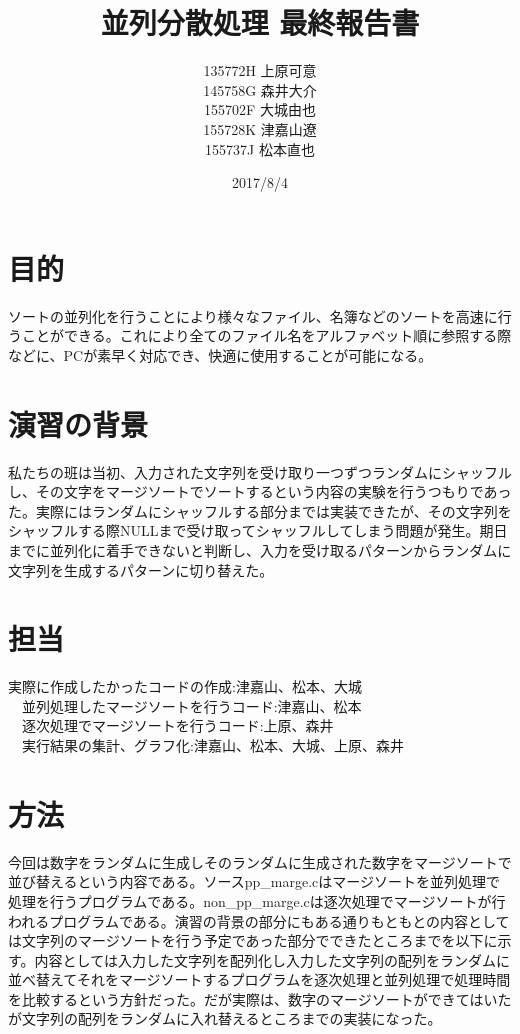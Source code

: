 \documentclass[11pt,a4paper]{jsarticle}
\begin{document}
\title{並列分散処理 最終報告書}
\author{135772H 上原可意\\145758G 森井大介\\155702F 大城由也\\155728K 津嘉山遼\\155737J 松本直也\\}
\date{2017/8/4}

\maketitle
\newpage
\section*{目的}
ソートの並列化を行うことにより様々なファイル、名簿などのソートを高速に行うことができる。これにより全てのファイル名をアルファベット順に参照する際などに、PCが素早く対応でき、快適に使用することが可能になる。

\section*{演習の背景}
私たちの班は当初、入力された文字列を受け取り一つずつランダムにシャッフルし、その文字をマージソートでソートするという内容の実験を行うつもりであった。実際にはランダムにシャッフルする部分までは実装できたが、その文字列をシャッフルする際NULLまで受け取ってシャッフルしてしまう問題が発生。期日までに並列化に着手できないと判断し、入力を受け取るパターンからランダムに文字列を生成するパターンに切り替えた。

\section*{担当}
実際に作成したかったコードの作成:津嘉山、松本、大城\\
　並列処理したマージソートを行うコード:津嘉山、松本\\
　逐次処理でマージソートを行うコード:上原、森井\\
　実行結果の集計、グラフ化:津嘉山、松本、大城、上原、森井


\section*{方法}
今回は数字をランダムに生成しそのランダムに生成された数字をマージソートで並び替えるという内容である。ソースpp\_marge.cはマージソートを並列処理で処理を行うプログラムである。non\_pp\_marge.cは逐次処理でマージソートが行われるプログラムである。演習の背景の部分にもある通りもともとの内容としては文字列のマージソートを行う予定であった部分でできたところまでを以下に示す。内容としては入力した文字列を配列化し入力した文字列の配列をランダムに並べ替えてそれをマージソートするプログラムを逐次処理と並列処理で処理時間を比較するという方針だった。だが実際は、数字のマージソートができてはいたが文字列の配列をランダムに入れ替えるところまでの実装になった。
\end{document}
